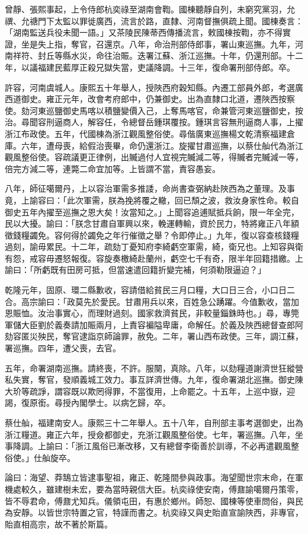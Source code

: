 \begin{pinyinscope}
曾靜、張熙事起，上令侍郎杭奕祿至湖南會鞫。國棟聽靜自列，未窮究黨羽，允禩、允禟門下太監以罪徙廣西，流言於路，直隸、河南督撫俱疏上聞。國棟奏言：「湖南監送兵役未聞一語。」又茶陵民陳蒂西傳播流言，敕國棟按鞫，亦不得實證，坐是失上指，奪官，召還京。八年，命治刑部侍郎事，署山東巡撫。九年，河南祥符、封丘等縣水災，命往治賑。迭署江蘇、浙江巡撫。十年，仍還刑部。十二年，以議福建民藍厚正殺兄獄失當，吏議降調。十三年，復命署刑部侍郎。卒。

許容，河南虞城人。康熙五十年舉人，授陜西府穀知縣。內遷工部員外郎，考選廣西道御史。雍正元年，改會考府郎中，仍兼御史。出為直隸口北道，遷陜西按察使。劾河東巡鹽御史馬喀以積鹽變價入己，上奪馬喀官，命兼管河東巡鹽御史，按治。尋聞容刑逼商人，解容任，令總督岳鍾琪覆按。鍾琪言容無刑逼商人事，上擢浙江布政使。五年，代國棟為浙江觀風整俗使。尋偕廣東巡撫楊文乾清察福建倉庫。六年，遭母喪，給假治喪畢，命仍還浙江。旋擢甘肅巡撫，以蔡仕舢代為浙江觀風整俗使。容疏議更正律例，出贓過付人宜視完贓減二等，得贓者完贓減一等，倍完方減二等，連斃二命宜加等。上皆謂不當，責容愚妄。

八年，師征噶爾丹，上以容治軍需多推諉，命尚書查弼納赴陜西為之董理。及事竟，上諭容曰：「此次軍需，朕為挽將覆之轍，回已頹之波，救汝身家性命。較自御史五年內擢至巡撫之恩大矣！汝當知之。」上聞容追逋賦抵兵餉，限一年全完，民以大擾。諭曰：「朕念甘肅自軍興以來，輓運轉輸，資於民力，特將雍正八年額徵錢糧蠲免。容何得於蠲免之年行催徵之舉？令即停止。」九年，復以容查核錢糧過刻，諭毋累民。十二年，疏劾丁憂知府李綺虧空軍需，綺，衛兄也。上知容與衛有怨，戒容毋遷怒報復。容旋奏檄綺赴蘭州，虧空七千有奇，限半年回籍措繳。上諭曰：「所虧既有田房可抵，但當速遣回籍折變完補，何須勒限逼迫？」

乾隆元年，固原、環二縣歉收，容請借給貧民三月口糧，大口日三合，小口日二合。高宗諭曰：「政莫先於愛民。甘肅用兵以來，百姓急公踴躍。今值歉收，當加恩賑恤。汝治事實心，而理財過刻。國家救濟貧民，非較量錙銖時也。」尋，專筦軍儲大臣劉於義奏請加賑兩月，上責容褊隘卑庸，命解任。於義及陜西總督查郎阿劾容匿災殃民，奪官逮詣京師論罪，赦免。二年，署山西布政使。三年，調江蘇，署巡撫。四年，遭父喪，去官。

五年，命署湖南巡撫。請終喪，不許。服闋，真除。八年，以劾糧道謝濟世狂縱營私失實，奪官，發順義城工效力。事互詳濟世傳。九年，復命署湖北巡撫。御史陳大玠等疏諍，謂容既以欺罔得罪，不當復用，上命罷之。十五年，上巡中嶽，迎謁，復原銜。尋授內閣學士。以病乞歸，卒。

蔡仕舢，福建南安人。康熙三十二年舉人。五十八年，自刑部主事考選御史，出為浙江糧道。雍正六年，授僉都御史，充浙江觀風整俗使。七年，署巡撫。八年，坐事降調。上諭曰：「浙江風俗已漸改移，又有總督李衛善於訓導，不必再遣觀風整俗使。」仕舢旋卒。

論曰：海望、莽鵠立皆逮事聖祖，雍正、乾隆間參與政事。海望聞世宗末命，在軍機處較久，雖建樹未宏，要為當時親信大臣。杭奕祿使安南，傅鼐諭噶爾丹策零，皆不辱君命，傅鼐尤知兵。儀領屯田，有惠於鄉州。師恕、國棟等使車問俗，與民為安靜。以皆世宗特置之官，特謹而書之。杭奕祿又與史貽直宣諭陜西，非專官，貽直相高宗，故不著於斯篇。


\end{pinyinscope}